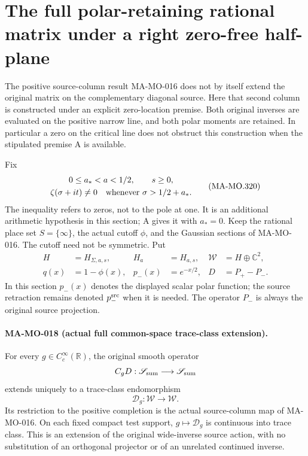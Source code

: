 \section{The full polar-retaining rational matrix under a right zero-free half-plane}
\label{sec:polar-common-matrix}

The positive source-column result MA-MO-016 does not by itself
extend the original matrix on the complementary diagonal source.
Here that second column is constructed under an explicit
zero-location premise. Both original inverses are evaluated on
the positive narrow line, and both polar moments are retained.
In particular a zero on the critical line does not obstruct this
construction when the stipulated premise A is available.

Fix
\[
 \begin{gathered}
 0\le a_*<a<1/2,\qquad s\ge0,\\
 \zeta(\sigma+it)\ne0
          \quad\hbox{whenever }\sigma>1/2+a_*.
 \end{gathered}
 \tag{MA-MO.320}
\]
The inequality refers to zeros, not to the pole at one. It is
an additional arithmetic hypothesis in this section; A gives
it with \(a_*=0\). Keep the rational place set
\(S=\{\infty\}\), the actual cutoff \(\phi\), and the
Gaussian sections of MA-MO-016. The cutoff need not be symmetric.
Put
\[
 \begin{aligned}
 H&=H_{\Sigma,a,s},&H_a&=H_{a,s},&
 \mathcal W&=H\oplus\mathbb C^2,\\
 q(x)&=1-\phi(x),&p_-(x)&=e^{-x/2},&
 D&=P_+-P_- .
 \end{aligned}
 \tag{MA-MO.321}
\]
In this section \(p_-(x)\) denotes the displayed scalar
polar function; the source retraction remains denoted
\(p_-^{\rm src}\) when it is needed. The operator \(P_-\)
is always the original source projection.

\paragraph{MA-MO-018 (actual full common-space trace-class extension).}
For every \(g\in C_c^\infty(\mathbb R)\), the original
smooth operator
\[
       C_gD:\mathscr S_{\rm sum}\longrightarrow
                                     \mathscr S_{\rm sum}
\]
extends uniquely to a trace-class endomorphism
\[
       \mathscr D_g:\mathcal W\longrightarrow\mathcal W.
 \tag{MA-MO.322}
\]
Its restriction to the positive completion is the actual
source-column map of MA-MO-016. On each fixed compact test
support, \(g\mapsto\mathscr D_g\) is continuous into trace
class. This is an extension of the original wide-inverse
source action, with no substitution of an orthogonal projector
or of an unrelated continued inverse.

